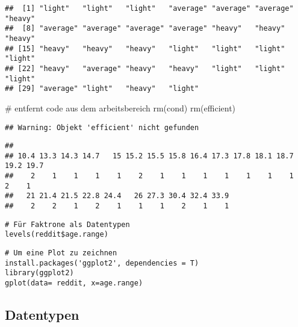 \documentclass[]{article}
\newenvironment{Shaded}{\begin{snugshade}}{\end{snugshade}}
\newcommand{\KeywordTok}[1]{\textcolor[rgb]{0.94,0.87,0.69}{{#1}}}
\newcommand{\CommentTok}[1]{\textcolor[rgb]{0.50,0.62,0.50}{{#1}}}
\newcommand{\NormalTok}[1]{\textcolor[rgb]{0.80,0.80,0.80}{{#1}}}
\begin{document}
\begin{verbatim}
##  [1] "light"   "light"   "light"   "average" "average" "average" "heavy"  
##  [8] "average" "average" "average" "average" "heavy"   "heavy"   "heavy"  
## [15] "heavy"   "heavy"   "heavy"   "light"   "light"   "light"   "light"  
## [22] "heavy"   "average" "heavy"   "heavy"   "light"   "light"   "light"  
## [29] "average" "light"   "heavy"   "light"
\end{verbatim}

\begin{Shaded}
\begin{Highlighting}[]
\CommentTok{# entfernt code aus dem arbeitsbereich}
\KeywordTok{rm}\NormalTok{(cond)}
\KeywordTok{rm}\NormalTok{(efficient)}
\end{Highlighting}
\end{Shaded}

\begin{verbatim}
## Warning: Objekt 'efficient' nicht gefunden
\end{verbatim}

\begin{Shaded}
\end{Shaded}

\begin{verbatim}
## 
## 10.4 13.3 14.3 14.7   15 15.2 15.5 15.8 16.4 17.3 17.8 18.1 18.7 19.2 19.7 
##    2    1    1    1    1    2    1    1    1    1    1    1    1    2    1 
##   21 21.4 21.5 22.8 24.4   26 27.3 30.4 32.4 33.9 
##    2    2    1    2    1    1    1    2    1    1
\end{verbatim}

\begin{verbatim}
# Für Faktrone als Datentypen
levels(reddit$age.range)
\end{verbatim}

\begin{verbatim}
# Um eine Plot zu zeichnen
install.packages('ggplot2', dependencies = T)
library(ggplot2)
gplot(data= reddit, x=age.range)
\end{verbatim}

\subsection{Datentypen}\label{datentypen}
\end{document}
